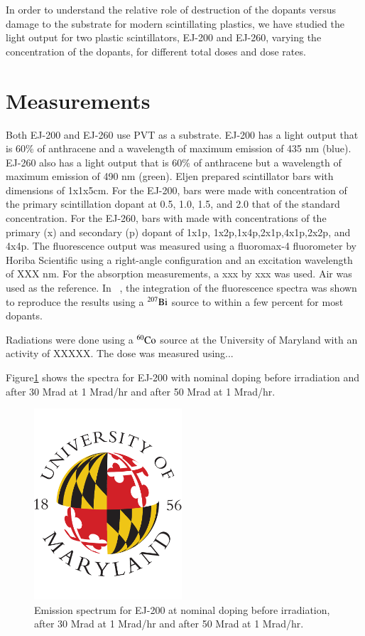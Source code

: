 \documentclass[review]{elsarticle}
\begin{document}
In order to understand the relative role of destruction of the dopants versus damage to the substrate for modern scintillating plastics,
we have studied the light output for two plastic scintillators, EJ-200 and EJ-260, varying the concentration of the dopants, for
different total doses and dose rates.  




\section{Measurements}
Both EJ-200 and EJ-260 use PVT as a substrate.  EJ-200 has a light output that is 60\% of anthracene and a wavelength of maximum emission of 435 nm (blue).  
EJ-260 also has a light output that is 60\% of anthracene but a wavelength of maximum emission of 490 nm (green).  Eljen prepared scintillator bars
with dimensions of 1x1x5cm.  For the EJ-200, bars were made with concentration of the primary scintillation dopant at 0.5, 1.0, 1.5, and 2.0 that of
the standard concentration.  For the EJ-260, bars with made with concentrations of the primary (x) and secondary (p) dopant of 1x1p, 1x2p,1x4p,2x1p,4x1p,2x2p, and 4x4p.
The fluorescence output was measured using a fluoromax-4 fluorometer by Horiba Scientific using a right-angle configuration and an excitation wavelength of
XXX nm.  For the absorption measurements, a xxx by xxx was used.
Air was used as the reference.  In ~\cite{Bross199135}, the integration
of the fluorescence spectra was shown to reproduce the results using a
$\rm{^{207}Bi}$ source to within a few percent for most dopants.

Radiations were done using a ${\rm ^{60}Co}$ source at the University of Maryland with an activity of XXXXX.  
The dose was measured using...

Figure\ref{fig:ej200doping1x} shows the spectra for EJ-200 with nominal doping before irradiation and after
30 Mrad at 1 Mrad/hr and after 50 Mrad at 1 Mrad/hr.

\begin{figure}[!ht]
\begin{center}
\includegraphics[width=0.49\textwidth]{./figures/placeholder.pdf}
\caption{
Emission spectrum for EJ-200 at nominal doping before irradiation, after 30 Mrad at 1 Mrad/hr and after 50 Mrad at 1 Mrad/hr.
}
\label{fig:ej200doping1x}
\end{center}
\end{figure}
\end{document}
